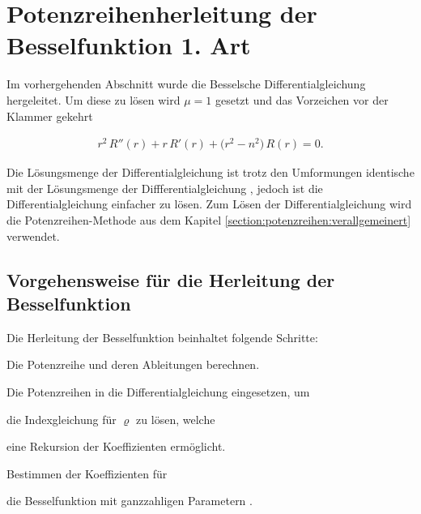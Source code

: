 \section[Potenzreihenherleitung der Besselfunktion]{Potenzreihenherleitung der Besselfunktion 1. Art}
\begin{normalsize}
Im vorhergehenden Abschnitt wurde die Besselsche Differentialgleichung  hergeleitet.
Um diese zu l\"osen wird $\mu = 1$ gesetzt und das Vorzeichen vor der Klammer gekehrt
\end{normalsize}
\begin{align}
	r^2 \, R'' \left( r \right)
	+
	r \, R' \left( r \right)
	+
	\big( r^2 - n^2 \big) \, R \left( r \right)
	=
	0
	\label{eq:bessel:dgl}
	\text{.}
\end{align}
\begin{normalsize}%
Die L\"osungsmenge der Differentialgleichung  ist trotz den Umformungen identische mit der L\"osungsmenge der Diffferentialgleichung , jedoch ist die Differentialgleichung  einfacher zu l\"osen.
Zum L\"osen der Differentialgleichung  wird die Potenzreihen-Methode aus dem Kapitel \ref{section:potenzreihen:verallgemeinert} verwendet.
\end{normalsize}
\subsection{Vorgehensweise f\"ur die Herleitung der Besselfunktion}
\begin{normalsize}%
Die Herleitung der Besselfunktion beinhaltet folgende Schritte:
\end{normalsize}
\begin{compactenum}
	\item Die Potenzreihe und deren Ableitungen berechnen.
	\item Die Potenzreihen in die Differentialgleichung  eingesetzen, um
	\item die Indexgleichung f\"ur $\varrho$ zu l\"osen, welche
	\item eine Rekursion der Koeffizienten erm\"oglicht.
	\item Bestimmen der Koeffizienten f\"ur
	\item die Besselfunktion mit ganzzahligen Parametern .
\end{compactenum}
\setcounter{stepCounter}{1}
